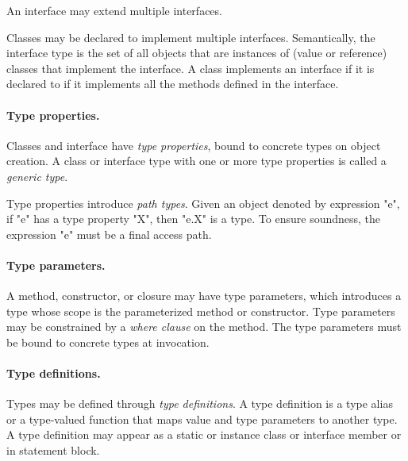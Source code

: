         An interface may extend multiple interfaces.

Classes may be declared to implement 
multiple interfaces. 
Semantically, the interface type is the set of all objects that are
instances of (value or reference) classes that implement the
interface. A class implements an interface if it is declared to if
it implements all the methods defined in the interface.
        
\paragraph{Type properties.}


        Classes and interface have {\em type properties}, bound
        to concrete types on object creation.
        A class or interface type
        with one or more type properties is called a {\em
        generic type}.

        Type properties introduce {\em path types}.
        Given an object
        denoted by expression \xcd"e", if \xcd"e" has a 
        type property \xcd"X", then \xcd"e.X" is a type.
        To ensure soundness, the expression \xcd"e"
        must be a final access path.  

\paragraph{Type parameters.}


        A method, constructor, or closure may have type parameters, which
        introduces a type whose scope is the parameterized method or
        constructor. 
        Type parameters may be constrained by a {\em where
        clause} on the method.
        The type parameters must be bound to
        concrete types at invocation.

\paragraph{Type definitions.}

        Types may be defined through {\em type definitions}.
        A type definition is a type alias or a type-valued function
        that maps value and type parameters to another type.
        A type definition may appear as a static or instance
        class or interface
        member or in statement block.


